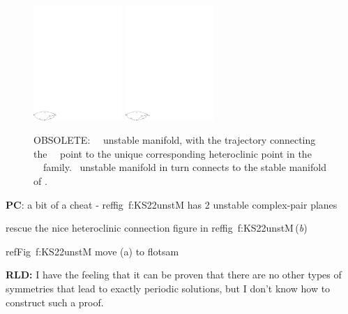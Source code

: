 \begin{figure} [t]
\begin{center}
\includegraphics[width=0.3\textwidth]{../figs/ks22_E1_UM_diag}
\includegraphics[width=0.3\textwidth]{../figs/ks22_E2_UM_diag}
\end{center}
\caption[OBSOLETE: EQV{1}~\eqv\ unstable manifold]
        {OBSOLETE:
~\eqv\ unstable manifold,
    with the trajectory connecting the
~\eqv\ point to the unique corresponding heteroclinic
point in the ~\eqv\ family.
~unstable manifold in turn connects  to the
stable manifold of .
        }
\label{f:KS22cage}
\end{figure}
{\bf PC}: a bit of a cheat - reffig~{f:KS22unstM} has
    2 unstable complex-pair planes

rescue the nice heteroclinic connection figure
    in reffig~{f:KS22unstM}\,(\textit{b})

    refFig~{f:KS22unstM} move (a) to flotsam

{\bf RLD:} I have the feeling that it can be proven that there are
no other types of symmetries that lead to exactly periodic
solutions, but I don't know how to construct such a proof.

